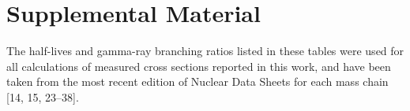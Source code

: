 \documentclass[a4paper,10pt]{article}
\title{}
\author{}
\begin{document}

% 


\section{Supplemental Material} \label{fe_supp_material}
% 
The   half-lives and gamma-ray branching ratios  listed in these tables were used for all calculations of measured cross sections reported in this work, and have been taken from the most recent edition of  Nuclear Data Sheets for each  mass chain  [14, 15, 23--38].
\end{document}
